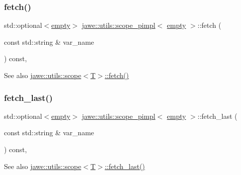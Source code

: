 \subsubsection{\texorpdfstring{fetch()}{fetch()}}
{\footnotesize\ttfamily std\+::optional$<$\hyperlink{classjawe_1_1utils_1_1empty}{empty}$>$ \hyperlink{classjawe_1_1utils_1_1scope__pimpl}{jawe\+::utils\+::scope\+\_\+pimpl}$<$ \hyperlink{classjawe_1_1utils_1_1empty}{empty} $>$\+::fetch (\begin{DoxyParamCaption}\item[{const std\+::string \&}]{var\+\_\+name }\end{DoxyParamCaption}) const\hspace{0.3cm}{\ttfamily [inline]}, {\ttfamily [private]}}

\begin{DoxySeeAlso}{See also}
\hyperlink{classjawe_1_1utils_1_1scope_aa0db4d0cbe6a4020ed496cd5cbcd8e6a}{jawe\+::utils\+::scope$<$\+T$>$\+::fetch()} 
\end{DoxySeeAlso}
\mbox{\label{classjawe_1_1utils_1_1scope__pimpl_3_01empty_01_4_ab2950539698581fa27a3c59937ac9c1e}} 
\subsubsection{\texorpdfstring{fetch\+\_\+last()}{fetch\_last()}}
{\footnotesize\ttfamily std\+::optional$<$\hyperlink{classjawe_1_1utils_1_1empty}{empty}$>$ \hyperlink{classjawe_1_1utils_1_1scope__pimpl}{jawe\+::utils\+::scope\+\_\+pimpl}$<$ \hyperlink{classjawe_1_1utils_1_1empty}{empty} $>$\+::fetch\+\_\+last (\begin{DoxyParamCaption}\item[{const std\+::string \&}]{var\+\_\+name }\end{DoxyParamCaption}) const\hspace{0.3cm}{\ttfamily [inline]}, {\ttfamily [private]}}

\begin{DoxySeeAlso}{See also}
\hyperlink{classjawe_1_1utils_1_1scope_a0c78dd9721664a665190297c4a5b06a7}{jawe\+::utils\+::scope$<$\+T$>$\+::fetch\+\_\+last()} 
\end{DoxySeeAlso}
\mbox{\label{classjawe_1_1utils_1_1scope__pimpl_3_01empty_01_4_a882dea09bc4ee971c8effa5004b5dee3}} 
